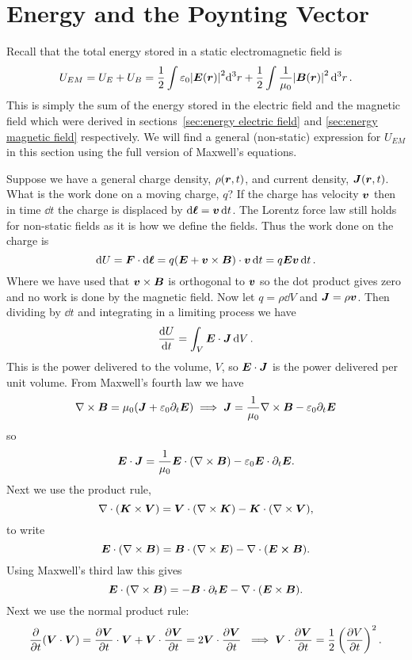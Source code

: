     \section{Energy and the Poynting Vector}
    Recall that the total energy stored in a static electromagnetic field is
    \[U_{EM} = U_E + U_B = \frac{1}{2}\int \varepsilon_0\abs{\bm{E}(\bm{r})}^2 \dd[3]r + \frac{1}{2}\int \frac{1}{\mu_0}\abs{\bm{B}(\bm{r})}^2\dd[3]{r}.\]
    This is simply the sum of the energy stored in the electric field and the magnetic field which were derived in sections~\ref{sec:energy electric field} and \ref{sec:energy magnetic field} respectively.
    We will find a general (non-static) expression for \(U_{EM}\) in this section using the full version of Maxwell's equations.
    
    Suppose we have a general charge density, \(\rho(\bm{r}, t)\), and current density, \(\bm{J}(\bm{r}, t)\).
    What is the work done on a moving charge, \(q\)?
    If the charge has velocity \(\bm{v}\) then in time \(\dd{t}\) the charge is displaced by \(\dd{\bm{\ell}} = \bm{v}\dd{t}\).
    The Lorentz force law still holds for non-static fields as it is how we define the fields.
    Thus the work done on the charge is
    \[\dd{U} = \bm{F}\cdot\dd{\bm{\ell}} = q(\bm{E} + \bm{v}\times\bm{B}) \cdot \bm{v}\dd{t} = q\bm{E}\bm{v}\dd{t}.\]
    Where we have used that \(\bm{v}\times\bm{B}\) is orthogonal to \(\bm{v}\) so the dot product gives zero and no work is done by the magnetic field.
    Now let \(q = \rho\dd{V}\)  and \(\bm{J} = \rho\bm{v}\).
    Then dividing by \(\dd{t}\) and integrating in a limiting process we have
    \[\dv{U}{t} = \int_V\bm{E}\cdot\bm{J}\dd{V}.\]
    This is the power delivered to the volume, \(V\), so \(\bm{E}\cdot\bm{J}\) is the power delivered per unit volume.
    From Maxwell's fourth law we have
    \[\nabla\times\bm{B} = \mu_0(\bm{J} + \varepsilon_0\partial_t\bm{E}) \implies  \bm{J} = \frac{1}{\mu_0}\nabla\times\bm{B} - \varepsilon_0\partial_t\bm{E}\]
    so
    \[\bm{E}\cdot\bm{J} = \frac{1}{\mu_0}\bm{E}\cdot(\nabla\times\bm{B}) - \varepsilon_0\bm{E}\cdot\partial_t\bm{E}.\]
    Next we use the product rule,
    \[\nabla\cdot(\bm{K}\times\bm{V}) = \bm{V}\cdot(\nabla\times\bm{K}) - \bm{K}\cdot(\nabla\times\bm{V}),\]
    to write
    \[\bm{E}\cdot(\nabla\times\bm{B}) = \bm{B}\cdot(\nabla\times\bm{E}) - \nabla\cdot(\bm{E\times\bm{B}}).\]
    Using Maxwell's third law this gives
    \[\bm{E}\cdot(\nabla\times\bm{B}) = -\bm{B}\cdot\partial_t\bm{E} - \nabla\cdot(\bm{E}\times\bm{B}).\]
    Next we use the normal product rule:
    \[\pdv{t}(\bm{V}\cdot\bm{V}) = \pdv{\bm{V}}{t}\cdot\bm{V} + \bm{V}\cdot\pdv{\bm{V}}{t} = 2\bm{V}\cdot\pdv{\bm{V}}{t}\ \implies \bm{V}\cdot\pdv{\bm{V}}{t} = \frac{1}{2}\left(\pdv{V}{t}\right)^2.\]
